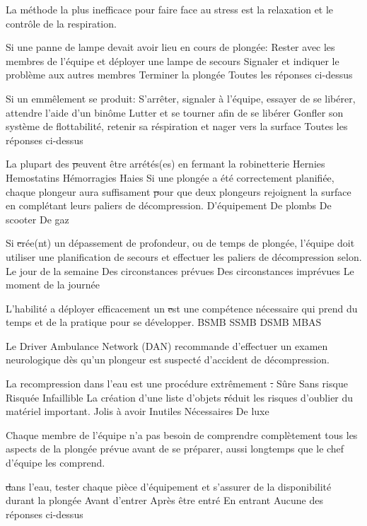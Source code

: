 \documentclass[english,10pt,twoside]{article}
\begin{document}
\begin{outline}
		\1 La méthode la plus inefficace pour faire face au stress est la relaxation et le contrôle de la respiration. \vf

		\1 Si une panne de lampe devait avoir lieu en cours de plongée:
			\2 Rester avec les membres de l'équipe et déployer une lampe de secours
			\2 Signaler et indiquer le problème aux autres membres
			\2 Terminer la plongée
			\2 Toutes les réponses ci-dessus

		\1 Si un emmêlement se produit:
			\2 S'arrêter, signaler à l'équipe, essayer de se libérer, attendre l'aide d'un binôme
			\2 Lutter et se tourner afin de se libérer
			\2 Gonfler son système de flottabilité, retenir sa réspiration et nager vers la surface
			\2 Toutes les réponses ci-dessus

		\1 La plupart des \st peuvent être arrétés(es) en fermant la robinetterie
			\2 Hernies
			\2 Hemostatins
			\2 Hémorragies
			\2 Haies
		\1 Si une plongée a été correctement planifiée, chaque plongeur aura suffisament \st pour que deux plongeurs rejoignent la surface en complétant leurs paliers de décompression.
			\2 D'équipement
			\2 De plombs
			\2 De scooter
			\2 De gaz

		\1 Si \st crée(nt) un dépassement de profondeur, ou de temps de plongée, l'équipe doit utiliser une planification de secours et effectuer les paliers de décompression selon.
			\2 Le jour de la semaine
			\2 Des circonstances prévues
			\2 Des circonstances imprévues
			\2 Le moment de la journée

		\1 L'habilité a déployer efficacement un \st est une compétence nécessaire qui prend du temps et de la pratique pour se développer.
			\2 BSMB
			\2 SSMB
			\2 DSMB
			\2 MBAS

		\1 Le Driver Ambulance Network (DAN) recommande d'effectuer un examen neurologique dès qu'un plongeur est suspecté d'accident de décompression. \vf

		\1 La recompression dans l'eau est une procédure extrêmement \st.
			\2 Sûre
			\2 Sans risque
			\2 Risquée
			\2 Infaillible
		\1 La création d'une liste d'objets \st réduit les risques d'oublier du matériel important.
			\2 Jolis à avoir
			\2 Inutiles
			\2 Nécessaires
			\2 De luxe

		\1 Chaque membre de l'équipe n'a pas besoin de comprendre complètement tous les aspects de la plongée prévue avant de se préparer, aussi longtemps que le chef d'équipe les comprend. \vf

		\1 \st dans l'eau, tester chaque pièce d'équipement et s'assurer de la disponibilité durant la plongée
			\2 Avant d'entrer
			\2 Après être entré
			\2 En entrant
			\2 Aucune des réponses ci-dessus


\end{outline}
\end{document}
